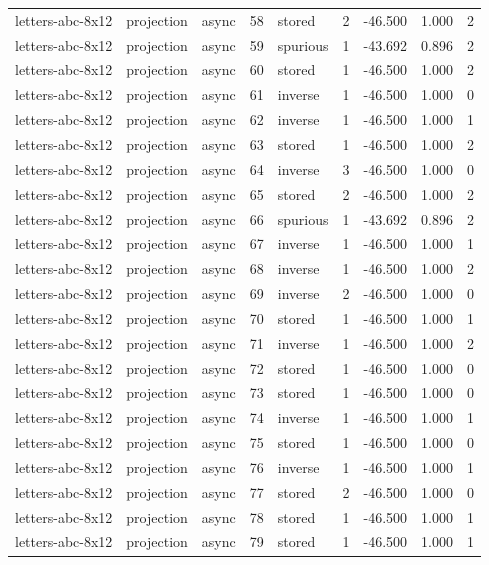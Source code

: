 \begin{tabular}{lllrlrrrr}
letters-abc-8x12 & projection & async & 58 & stored & 2 & -46.500 & 1.000 & 2 \\
letters-abc-8x12 & projection & async & 59 & spurious & 1 & -43.692 & 0.896 & 2 \\
letters-abc-8x12 & projection & async & 60 & stored & 1 & -46.500 & 1.000 & 2 \\
letters-abc-8x12 & projection & async & 61 & inverse & 1 & -46.500 & 1.000 & 0 \\
letters-abc-8x12 & projection & async & 62 & inverse & 1 & -46.500 & 1.000 & 1 \\
letters-abc-8x12 & projection & async & 63 & stored & 1 & -46.500 & 1.000 & 2 \\
letters-abc-8x12 & projection & async & 64 & inverse & 3 & -46.500 & 1.000 & 0 \\
letters-abc-8x12 & projection & async & 65 & stored & 2 & -46.500 & 1.000 & 2 \\
letters-abc-8x12 & projection & async & 66 & spurious & 1 & -43.692 & 0.896 & 2 \\
letters-abc-8x12 & projection & async & 67 & inverse & 1 & -46.500 & 1.000 & 1 \\
letters-abc-8x12 & projection & async & 68 & inverse & 1 & -46.500 & 1.000 & 2 \\
letters-abc-8x12 & projection & async & 69 & inverse & 2 & -46.500 & 1.000 & 0 \\
letters-abc-8x12 & projection & async & 70 & stored & 1 & -46.500 & 1.000 & 1 \\
letters-abc-8x12 & projection & async & 71 & inverse & 1 & -46.500 & 1.000 & 2 \\
letters-abc-8x12 & projection & async & 72 & stored & 1 & -46.500 & 1.000 & 0 \\
letters-abc-8x12 & projection & async & 73 & stored & 1 & -46.500 & 1.000 & 0 \\
letters-abc-8x12 & projection & async & 74 & inverse & 1 & -46.500 & 1.000 & 1 \\
letters-abc-8x12 & projection & async & 75 & stored & 1 & -46.500 & 1.000 & 0 \\
letters-abc-8x12 & projection & async & 76 & inverse & 1 & -46.500 & 1.000 & 1 \\
letters-abc-8x12 & projection & async & 77 & stored & 2 & -46.500 & 1.000 & 0 \\
letters-abc-8x12 & projection & async & 78 & stored & 1 & -46.500 & 1.000 & 1 \\
letters-abc-8x12 & projection & async & 79 & stored & 1 & -46.500 & 1.000 & 1 \\

\end{tabular}
